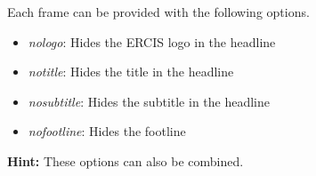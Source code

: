 \begin{frame}[label=framelayoutvariants]
    \frametitle{}
    \framesubtitle{}

    Each frame can be provided with the following options.

    \begin{itemize}
        \item \textit{nologo}: Hides the ERCIS logo in the headline
        \item \textit{notitle}: Hides the title in the headline
        \item \textit{nosubtitle}: Hides the subtitle in the headline
        \item \textit{nofootline}: Hides the footline
    \end{itemize}

    \textbf{\textcolor{ercisred}{Hint:}} These options can also be combined.
\end{frame}



